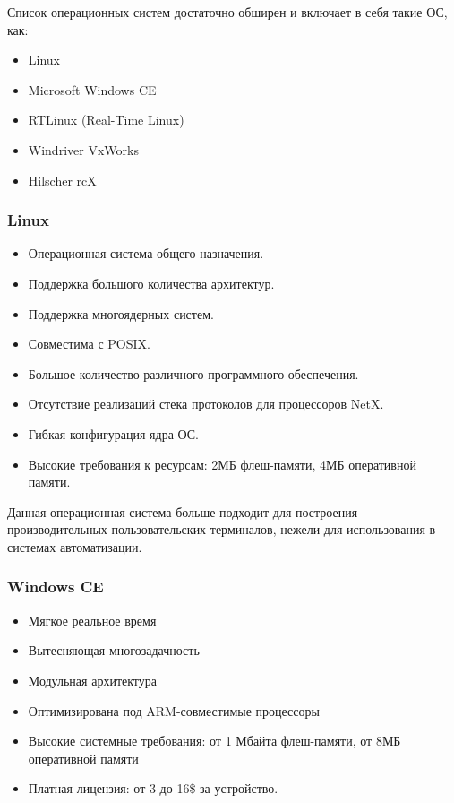 \documentclass[a4paper,14pt,bachelor]{disser}
\begin{document}
Список операционных систем достаточно обширен и включает в себя такие ОС, как:
\begin{itemize}
 \item Linux
 \item Microsoft Windows CE
 \item RTLinux (Real-Time Linux)
 \item Windriver VxWorks
 \item Hilscher rcX
\end{itemize}

\subsubsection{Linux}
\begin{itemize}
 \item Операционная система общего назначения.
 \item Поддержка большого количества архитектур.
 \item Поддержка многоядерных систем.
 \item Совместима с POSIX.
 \item Большое количество различного программного обеспечения.
 \item Отсутствие реализаций стека протоколов для процессоров NetX.
 \item Гибкая конфигурация ядра ОС.
 \item Высокие требования к ресурсам: 2МБ флеш-памяти, 4МБ оперативной памяти.
\end{itemize}

Данная операционная система больше подходит для построения производительных пользовательских терминалов, нежели для использования в системах автоматизации.

\subsubsection{Windows CE}
\begin{itemize}
 \item Мягкое реальное время
 \item Вытесняющая многозадачность
 \item Модульная архитектура
 \item Оптимизирована под ARM-совместимые процессоры
 \item Высокие системные требования: от 1 Мбайта флеш-памяти, от 8МБ оперативной памяти
 \item Платная лицензия: от 3 до 16\$ за устройство.
\end{itemize}
\end{document}
